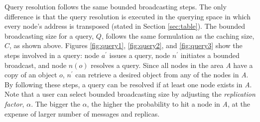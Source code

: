 \documentclass[9.5pt,journal,final,finalsubmission,twocolumn]{IEEEtran}
\begin{document}
Query resolution follows the same bounded broadcasting steps. The only
difference is that the query resolution is executed in the querying
space in which every node's address is transposed (stated  
in Section \ref{sec:table}). The bounded broadcasting size for a query, $Q$,
follows the same formulation as the caching size, $C$, as shown above. Figures
\ref{fig:query1}, \ref{fig:query2}, and \ref{fig:query3} show the
steps involved in a query: node $a^\prime$ issues a query, node $n^\prime$ initiates a 
bounded broadcast, and node $n(o)$ resolves a query. Since all nodes in the area
\textit{A} have a copy of an object $o$, $n^\prime$ can retrieve
a desired object from any of the nodes in \textit{A}. By following these
steps, a query can be resolved if at least one node exists in
\textit{A}. Note that a user can select bounded broadcasting size by adjusting 
the \textit{replication factor}, $\alpha$. The bigger the $\alpha$, 
the higher the probability to hit a node in \textit{A}, at the expense of 
larger number of messages and replicas. 
\end{document}

